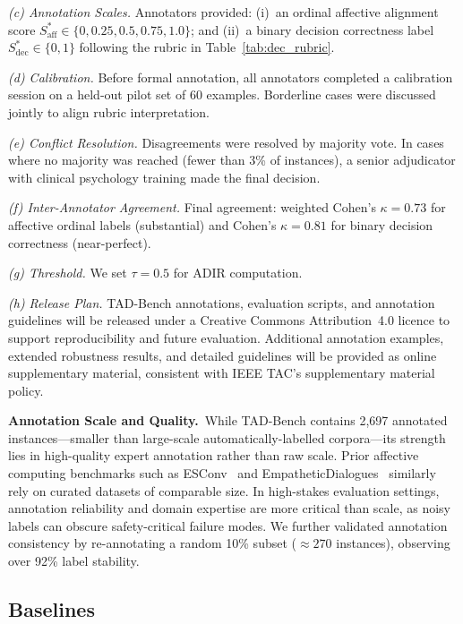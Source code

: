 \documentclass[lettersize,journal]{IEEEtran}
\begin{document}
\textit{(c) Annotation Scales.}
Annotators provided: (i)~an ordinal affective alignment score
$S_\mathrm{aff}^*\!\in\!\{0, 0.25, 0.5, 0.75, 1.0\}$; and (ii)~a binary
decision correctness label $S_\mathrm{dec}^*\!\in\!\{0,1\}$ following the
rubric in Table~\ref{tab:dec_rubric}.

\textit{(d) Calibration.}
Before formal annotation, all annotators completed a calibration session
on a held-out pilot set of 60 examples.  Borderline cases were discussed
jointly to align rubric interpretation.

\textit{(e) Conflict Resolution.}
Disagreements were resolved by majority vote.  In cases where no majority
was reached (fewer than 3\% of instances), a senior adjudicator with
clinical psychology training made the final decision.

\textit{(f) Inter-Annotator Agreement.}
Final agreement: weighted Cohen's $\kappa{=}0.73$ for affective ordinal
labels (substantial) and Cohen's $\kappa{=}0.81$ for binary decision
correctness (near-perfect).

\textit{(g) Threshold.}  We set $\tau{=}0.5$ for ADIR computation.

\textit{(h) Release Plan.}
TAD-Bench annotations, evaluation scripts, and annotation guidelines will
be released under a Creative Commons Attribution~4.0 licence to support
reproducibility and future evaluation.  Additional annotation examples,
extended robustness results, and detailed guidelines will be provided as
online supplementary material, consistent with IEEE TAC's supplementary
material policy.

\smallskip
\noindent\textbf{Annotation Scale and Quality.}~While TAD-Bench contains
2,697 annotated instances---smaller than large-scale automatically-labelled
corpora---its strength lies in high-quality expert annotation rather than
raw scale.  Prior affective computing benchmarks such as
ESConv~\cite{liu2021esc} and
EmpatheticDialogues~\cite{rashkin2019empathetic} similarly rely on curated
datasets of comparable size.  In high-stakes evaluation settings,
annotation reliability and domain expertise are more critical than scale,
as noisy labels can obscure safety-critical failure modes.  We further
validated annotation consistency by re-annotating a random 10\% subset
(${{\approx}}270$ instances), observing over 92\% label stability.

\subsection{Baselines}
\end{document}
